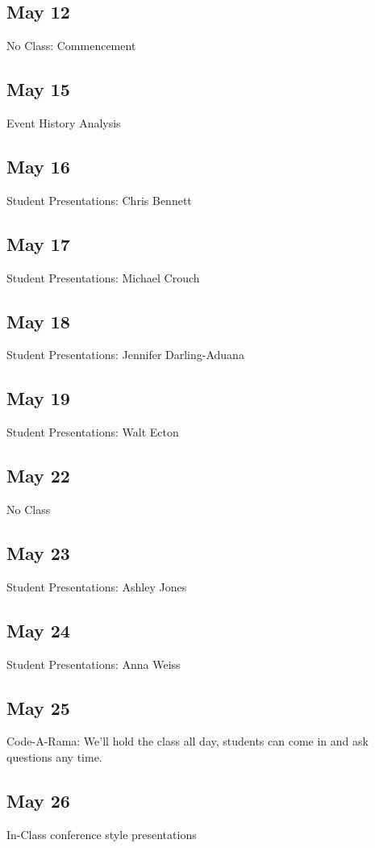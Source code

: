 \documentclass[10pt]{article}
\begin{document}
\subsection{May 12}
\label{sec:may-13}

No Class: Commencement

\subsection{May 15}

Event History Analysis


\subsection{May 16}
Student Presentations: Chris Bennett


\subsection{May 17}
Student Presentations: Michael Crouch


\subsection{May 18}
Student Presentations: Jennifer Darling-Aduana


\subsection{May 19}

Student Presentations: Walt Ecton

\subsection{May 22}
No Class


\subsection{May 23}
Student Presentations: Ashley Jones


\subsection{May 24} 
Student Presentations: Anna Weiss


\subsection{May 25}

Code-A-Rama: We'll hold the class all day, students can come in and
ask questions any time. 

\subsection{May 26}

In-Class conference style presentations
\end{document}
